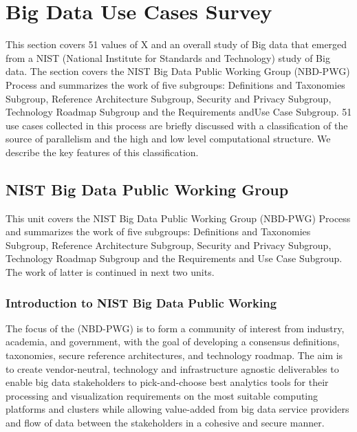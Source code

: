 

\chapter{Big Data Use Cases Survey}
\label{s:nist-usecase}

\FILENAME

This section covers 51 values of X and an overall study of Big data that
emerged from a NIST (National Institute for Standards and Technology)
study of Big data. The section covers the NIST Big Data Public Working
Group (NBD-PWG) Process and summarizes the work of five subgroups:
Definitions and Taxonomies Subgroup, Reference Architecture Subgroup,
Security and Privacy Subgroup, Technology Roadmap Subgroup and the
Requirements andUse Case Subgroup. 51 use cases collected in this
process are briefly discussed with a classification of the source of
parallelism and the high and low level computational structure. We
describe the key features of this classification.

\section{NIST Big Data Public Working Group}

This unit covers the NIST Big Data Public Working Group (NBD-PWG)
Process and summarizes the work of five subgroups: Definitions and
Taxonomies Subgroup, Reference Architecture Subgroup, Security and
Privacy Subgroup, Technology Roadmap Subgroup and the Requirements and
Use Case Subgroup. The work of latter is continued in next two units.




\subsection{Introduction to NIST Big Data Public Working }

The focus of the (NBD-PWG) is to form a community of interest from
industry, academia, and government, with the goal of developing a
consensus definitions, taxonomies, secure reference architectures, and
technology roadmap. The aim is to create vendor-neutral, technology and
infrastructure agnostic deliverables to enable big data stakeholders to
pick-and-choose best analytics tools for their processing and
visualization requirements on the most suitable computing platforms and
clusters while allowing value-added from big data service providers and
flow of data between the stakeholders in a cohesive and secure manner.


